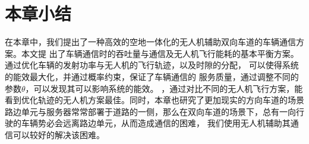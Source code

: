 \section{本章小结}\label{section4-6}

在本章中，我们提出了一种高效的空地一体化的无人机辅助双向车道的车辆通信方案。本文提
出了车辆通信时的吞吐量与通信及无人机飞行能耗的基本平衡方案。通过优化车辆的发射功率与无人机的飞行轨迹，以及时隙的分配，
可以使得系统的能效最大化，并通过概率约束，保证了车辆通信的 服务质量，通过调整不同的参数$\theta$，可以发现其可以影响系统的能效。
，通过对比不同的无人机飞行方案，能看到优化轨迹的无人机方案最佳。同时，本章也研究了更加现实的方向车道的场景
路边单元与服务器常常部署于道路的一侧，那么在双向车道的场景下，总有一向行驶的车辆势必会远离路边单元，从而造成通信的困难，
我们使用无人机辅助其通信可以较好的解决该困难。

